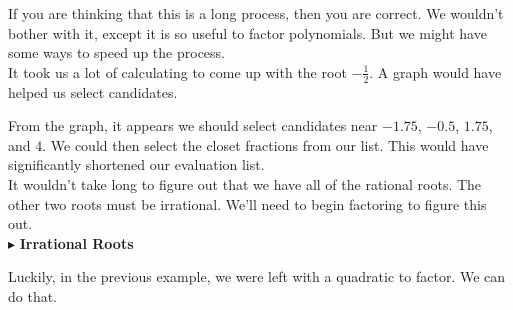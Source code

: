 \documentclass{ximera}
\begin{document}
If you are thinking that this is a long process, then you are correct.  We wouldn't bother with it, except it is so useful to factor polynomials.  But we might have some ways to speed up the process.  \\

It took us a lot of calculating to come up with the root $-\frac{1}{2}$.  A graph would have helped us select candidates.


\begin{center}
\end{center}


From the graph, it appears we should select candidates near $-1.75$, $-0.5$, $1.75$, and $4$. We could then select the closet fractions from our list. This would have significantly shortened our evaluation list.  \\

It wouldn't take long to figure out that we have all of the rational roots. The other two roots must be irrational.  We'll need to begin factoring to figure this out. \\



$\blacktriangleright$ \textbf{\textcolor{blue!55!black}{Irrational Roots}} 


Luckily, in the previous example, we were left with a quadratic to factor.  We can do that.
\end{document}
